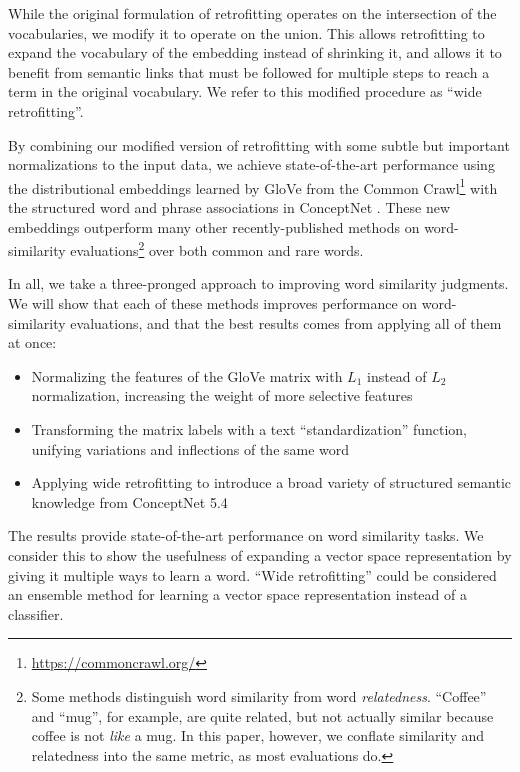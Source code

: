 \documentclass[11pt]{article}
\begin{document}
While the original formulation of retrofitting operates on the intersection of
the vocabularies, we modify it to operate on the union. This allows retrofitting
to expand the vocabulary of the embedding instead of shrinking it, and allows it
to benefit from semantic links that must be followed for multiple steps to reach
a term in the original vocabulary. We refer to this modified procedure as
``wide retrofitting''.

By combining our modified version of retrofitting with some subtle but important
normalizations to the input data, we achieve state-of-the-art performance using
the distributional embeddings learned by GloVe \cite{pennington2014glove} from
the Common Crawl\footnote{\url{https://commoncrawl.org/}} with the structured word and phrase
associations in ConceptNet \cite{speer2012conceptnet}. These new embeddings
outperform many other recently-published methods on word-similarity
evaluations\footnote{Some methods distinguish word similarity from word
{\em relatedness}. ``Coffee'' and ``mug'', for example, are quite related,
but not actually similar because coffee is not {\em like} a mug. In this paper,
however, we conflate similarity and relatedness into the same metric, as most
evaluations do.} over both common and rare words.

In all, we take a three-pronged approach to improving word similarity
judgments. We will show that each of these methods improves performance on
word-similarity evaluations, and that the best results comes from applying all
of them at once:

\begin{itemize}
\item Normalizing the features of the GloVe matrix with $L_1$ instead of $L_2$
    normalization, increasing the weight of more selective features
\item Transforming the matrix labels with a text ``standardization'' function,
    unifying variations and inflections of the same word
\item Applying wide retrofitting to introduce a broad variety of
    structured semantic knowledge from ConceptNet 5.4
\end{itemize}

The results provide state-of-the-art performance on word similarity tasks. We
consider this to show the usefulness of expanding a vector space representation
by giving it multiple ways to learn a word. ``Wide retrofitting'' could be
considered an ensemble method for learning a vector space representation
instead of a classifier.
\end{document}
